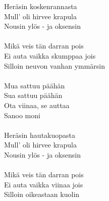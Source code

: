 Heräsin koskenrannasta \\
Mull' oli hirvee krapula \\
Nousin ylös - ja oksensin \\
\hspace{10mm} \\
Mikä veis tän darran pois \\
Ei auta vaikka skumppaa jois \\
Silloin neuvon vanhan ymmärsin \\
\hspace{10mm} \\
Mua sattuu päähän \\
Sua sattuu päähän \\
Ota viinaa, se auttaa \\
Sanoo moni \\
\hspace{10mm} \\
Heräsin hautakuopasta \\
Mull' oli hirvee krapula \\
Nousin ylös - ja oksensin \\
\hspace{10mm} \\
Mikä veis tän darran pois \\
Ei auta vaikka viinaa jois \\
Silloin oikeastaan kuolin \\

